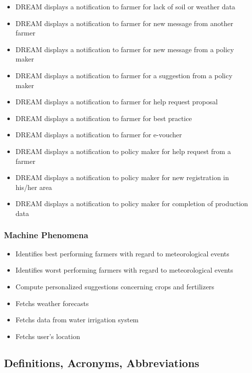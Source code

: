 \begin{itemize}
	\item
	DREAM displays a notification to farmer for lack of soil or weather data
	\item
	DREAM displays a notification to farmer for new message from another farmer
	\item
	DREAM displays a notification to farmer for new message from a policy maker
	\item
	DREAM displays a notification to farmer for a suggestion from a policy maker
	\item
	DREAM displays a notification to farmer for help request proposal
	\item
	DREAM displays a notification to farmer for best practice
	\item
	DREAM displays a notification to farmer for e-voucher
	\item
	DREAM displays a notification to policy maker for help request from a farmer
	\item
	DREAM displays a notification to policy maker for new registration in his/her area
	\item
	DREAM displays a notification to policy maker for completion of production data
	
\end{itemize}

\subsubsection{Machine Phenomena}
\begin{itemize}
	\item 
	Identifies best performing farmers with regard to meteorological events
	\item 
	Identifies worst performing farmers with regard to meteorological events
	\item 
	Compute personalized suggestions concerning crops and fertilizers
	\item 
	Fetchs weather forecasts
	\item 
	Fetchs data from water irrigation system
	\item 
	Fetchs user's location
	
\end{itemize}

\subsection{Definitions, Acronyms, Abbreviations}

